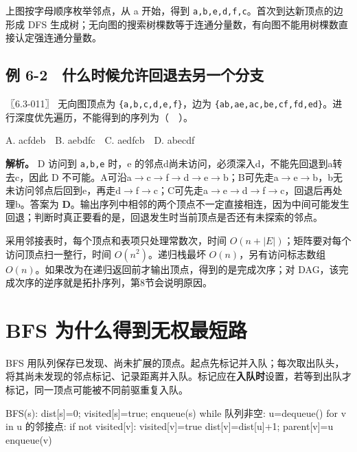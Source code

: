 上图按字母顺序枚举邻点，从 a 开始，得到 \texttt{a,\allowbreak{}b,\allowbreak{}e,\allowbreak{}d,\allowbreak{}f,\allowbreak{}c}。首次到达新顶点的边形成 DFS 生成树；无向图的搜索树棵数等于连通分量数，有向图不能用树棵数直接认定强连通分量数。

\subsection{例 6-2　什么时候允许回退去另一个分支}\label{DS06-ex2}

\begin{example}[配套案例]

〖6.3-011〗 无向图顶点为 \texttt{\{a,\allowbreak{}b,\allowbreak{}c,\allowbreak{}d,\allowbreak{}e,\allowbreak{}f\}}，边为 \texttt{\{ab,\allowbreak{}ae,\allowbreak{}ac,\allowbreak{}be,\allowbreak{}cf,\allowbreak{}fd,\allowbreak{}ed\}}。进行深度优先遍历，不能得到的序列为（　）。

A. acfdeb　B. aebdfc　C. aedfcb　D. abecdf

\end{example}

\textbf{解析。} D 访问到 \texttt{a,\allowbreak{}b,\allowbreak{}e} 时，e 的邻点d尚未访问，必须深入d，不能先回退到a转去c，因此 D 不可能。A可沿a\ensuremath{\to}c\ensuremath{\to}f\ensuremath{\to}d\ensuremath{\to}e\ensuremath{\to}b；B可先走a\ensuremath{\to}e\ensuremath{\to}b，b无未访问邻点后回到e，再走d\ensuremath{\to}f\ensuremath{\to}c；C可先走a\ensuremath{\to}e\ensuremath{\to}d\ensuremath{\to}f\ensuremath{\to}c，回退后再处理b。答案为 \textbf{D}。输出序列中相邻的两个顶点不一定直接相连，因为中间可能发生回退；判断时真正要看的是，回退发生时当前顶点是否还有未探索的邻点。

采用邻接表时，每个顶点和表项只处理常数次，时间 \(O(n+|E|)\)；矩阵要对每个访问顶点扫一整行，时间 \(O(n^2)\)。递归栈最坏 \(O(n)\)，另有访问标志数组 \(O(n)\)。如果改为在递归返回前才输出顶点，得到的是完成次序；对 DAG，该完成次序的逆序就是拓扑序列，第8节会说明原因。

\section{BFS 为什么得到无权最短路}\label{DS06-05}

BFS 用队列保存已发现、尚未扩展的顶点。起点先标记并入队；每次取出队头，将其尚未发现的邻点标记、记录距离并入队。标记应在\textbf{入队时}设置，若等到出队才标记，同一顶点可能被不同前驱重复入队。

\begin{codeblock}[language={}]
BFS(s):
    dist[s]=0; visited[s]=true; enqueue(s)
    while 队列非空:
        u=dequeue()
        for v in u 的邻接点:
            if not visited[v]:
                visited[v]=true
                dist[v]=dist[u]+1; parent[v]=u
                enqueue(v)
\end{codeblock}

